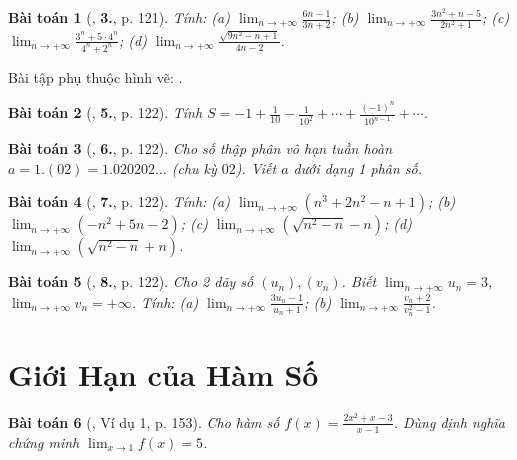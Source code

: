 \documentclass{article}
\newtheorem{baitoan}{Bài toán}
\begin{document}
\begin{baitoan}[\cite{SGK_Toan_11_dai_so_giai_tich_co_ban}, \textbf{3.}, p. 121]
	Tính: (a) $\lim_{n\to+\infty} \frac{6n - 1}{3n + 2}$; (b) $\lim_{n\to+\infty} \frac{3n^2 + n - 5}{2n^2 + 1}$; (c) $\lim_{n\to+\infty} \frac{3^n + 5\cdot4^n}{4^n + 2^n}$; (d) $\lim_{n\to+\infty} \frac{\sqrt{9n^2 - n + 1}}{4n - 2}$.
\end{baitoan}
Bài tập phụ thuộc hình vẽ: \cite[\textbf{4.}, p. 121]{SGK_Toan_11_dai_so_giai_tich_co_ban}.

\begin{baitoan}[\cite{SGK_Toan_11_dai_so_giai_tich_co_ban}, \textbf{5.}, p. 122]
	Tính $S = -1 + \frac{1}{10} - \frac{1}{10^2} + \cdots + \frac{(-1)^n}{10^{n-1}} + \cdots$.
\end{baitoan}

\begin{baitoan}[\cite{SGK_Toan_11_dai_so_giai_tich_co_ban}, \textbf{6.}, p. 122]
	Cho số thập phân vô hạn tuần hoàn $a = 1.(02) = 1.020202\ldots$ (chu kỳ $02$). Viết $a$ dưới dạng 1 phân số.
\end{baitoan}

\begin{baitoan}[\cite{SGK_Toan_11_dai_so_giai_tich_co_ban}, \textbf{7.}, p. 122]
	Tính: (a) $\lim_{n\to+\infty} (n^3 + 2n^2 - n + 1)$; (b) $\lim_{n\to+\infty} (-n^2 + 5n - 2)$; (c) $\lim_{n\to+\infty} \left(\sqrt{n^2 - n} - n\right)$; (d) $\lim_{n\to+\infty} \left(\sqrt{n^2 - n} + n\right)$.
\end{baitoan}

\begin{baitoan}[\cite{SGK_Toan_11_dai_so_giai_tich_co_ban}, \textbf{8.}, p. 122]
	Cho 2 dãy số $(u_n),(v_n)$. Biết $\lim_{n\to+\infty} u_n = 3$, $\lim_{n\to+\infty} v_n = +\infty$. Tính: (a) $\lim_{n\to+\infty} \frac{3u_n - 1}{u_n + 1}$; (b) $\lim_{n\to+\infty} \frac{v_n + 2}{v_n^2 - 1}$.
\end{baitoan}


\section{Giới Hạn của Hàm Số}

\begin{baitoan}[\cite{SBT_Toan_11_dai_so_giai_tich_co_ban}, Ví dụ 1, p. 153]
	Cho hàm số $f(x) = \frac{2x^2 + x - 3}{x - 1}$. Dùng định nghĩa chứng minh $\lim_{x\to1} f(x) = 5$.
\end{baitoan}
\end{document}
